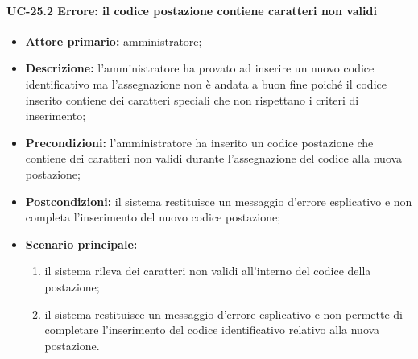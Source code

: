 \paragraph{UC-25.2 Errore: il codice postazione contiene caratteri non validi}
\begin{itemize}
	\item \textbf{Attore primario:} amministratore;
	\item \textbf{Descrizione:} l'amministratore ha provato ad inserire un nuovo codice identificativo ma l'assegnazione non è andata a buon fine poiché il codice inserito contiene dei caratteri speciali che non rispettano i criteri di inserimento;
	\item \textbf{Precondizioni:} l'amministratore ha inserito un codice postazione che contiene dei caratteri non validi durante l'assegnazione del codice alla nuova postazione;
	\item \textbf{Postcondizioni:} il sistema restituisce un messaggio d'errore esplicativo e non completa l'inserimento del nuovo codice postazione;
	\item \textbf{Scenario principale:}
	      \begin{enumerate}
		      \item il sistema rileva dei caratteri non validi all'interno del codice della postazione;
		      \item il sistema restituisce un messaggio d'errore esplicativo e non permette di completare l'inserimento del codice identificativo relativo alla nuova postazione.
	      \end{enumerate}
\end{itemize}

